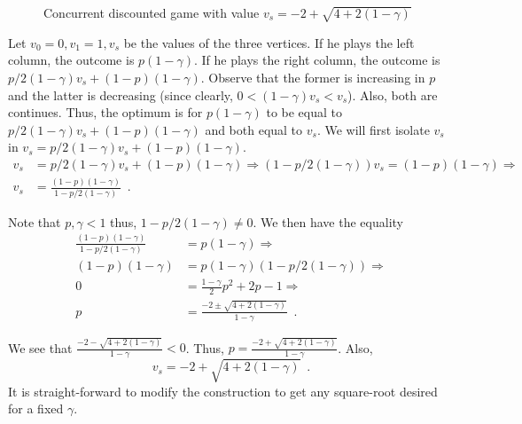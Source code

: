 \begin{figure}

\center
{}
\caption{Concurrent discounted game with value $v_s=-2+\sqrt{4+2(1-\gamma)}$}\label{fig:sqroot}
\end{figure}





Let $v_0=0,v_1=1,v_s$ be the values of the three vertices. If he plays the left column, the outcome is $p(1-\gamma)$.
If he plays the right column, the outcome is $p/2(1-\gamma)v_s+(1-p)(1-\gamma)$. Observe that the former is increasing in $p$ and the latter is decreasing (since clearly, $0<(1-\gamma)v_s<v_s$). Also, both are continues. Thus, the optimum is for $p(1-\gamma)$ to be equal to $p/2(1-\gamma)v_s+(1-p)(1-\gamma)$ and both equal to $v_s$.
We will first isolate $v_s$ in $v_s=p/2(1-\gamma)v_s+(1-p)(1-\gamma)$.
\begin{align*}
v_s&=p/2(1-\gamma)v_s+(1-p)(1-\gamma)\Rightarrow (1-p/2(1-\gamma))v_s=(1-p)(1-\gamma)\Rightarrow \\
v_s&=\frac{(1-p)(1-\gamma)}{1-p/2(1-\gamma)}\enspace .
\end{align*}

Note that $p,\gamma<1$ thus, $1-p/2(1-\gamma)\neq 0$.
We then have the equality 
\begin{align*}
\frac{(1-p)(1-\gamma)}{1-p/2(1-\gamma)}&=p(1-\gamma)\Rightarrow\\(1-p)(1-\gamma)&=p(1-\gamma)(1-p/2(1-\gamma))\Rightarrow\\
0&=\frac{1-\gamma}{2} p^2+2p-1\Rightarrow \\
p&=\frac{-2\pm\sqrt{4+2(1-\gamma)}}{1-\gamma} \enspace .
\end{align*}

We see that $\frac{-2-\sqrt{4+2(1-\gamma)}}{1-\gamma}<0$. Thus, $p=\frac{-2+\sqrt{4+2(1-\gamma)}}{1-\gamma}$.
Also, \[v_s=-2+\sqrt{4+2(1-\gamma)}\enspace .\] 
It is straight-forward to modify the construction to get any square-root desired for a fixed $\gamma$. 



